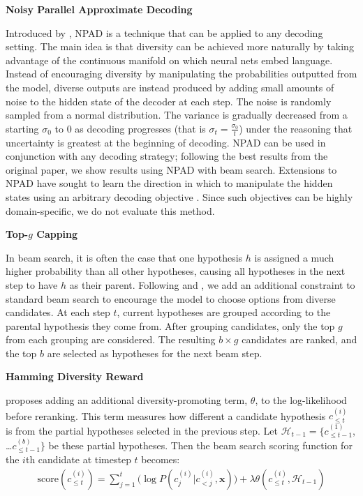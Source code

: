 \documentclass[thesis.tex]{subfiles}
\begin{document}
\noindent\textbf{Noisy Parallel Approximate Decoding}\quad

Introduced by \cite{cho2016noisy}, NPAD is a technique that can be applied to any decoding setting.
The main idea is that diversity can be achieved more naturally by taking advantage of the continuous manifold on which neural nets embed language. Instead of encouraging diversity by manipulating the probabilities outputted from the model, diverse outputs are instead produced by adding small amounts of noise to the hidden state of the decoder at each step. The noise is randomly sampled from a normal distribution. The variance is gradually decreased from a starting $\sigma_0$ to 0 as decoding progresses (that is $\sigma_t = \frac{\sigma_0}{t}$) under the reasoning that uncertainty is greatest at the beginning of decoding. NPAD can be used in conjunction with any decoding strategy; following the best results from the original paper, we show results using NPAD with beam search. Extensions to NPAD have sought to learn the direction in which to manipulate the hidden states using an arbitrary decoding objective \citep{gu2017trainable}. Since such objectives can be highly domain-specific, we do not evaluate this method.

\noindent\textbf{Top-$g$ Capping}\quad

In beam search, it is often the case that one hypothesis $h$ is assigned a much higher probability than all other hypotheses, causing all hypotheses in the next step to have $h$ as their parent. Following \cite{li2016mutual} and \cite{li2016simple}, we add an additional constraint to standard beam search to encourage the model to choose options from diverse candidates. At each step $t$, current hypotheses are grouped according to the parental hypothesis they come from. After grouping candidates, only the top $g$ from each grouping are considered. The resulting $b \times g$ candidates are ranked, and the top $b$ are selected as hypotheses for the next beam step.

\noindent\textbf{Hamming Diversity Reward}\quad

\cite{vijayakumar2016diverse} proposes adding an additional diversity-promoting term, $\theta$, to the log-likelihood before reranking. This term measures how different a candidate hypothesis $c^{(i)}_{\leq t}$ is from the partial hypotheses selected in the previous step. Let $\mathcal{H}_{t-1} = \{c^{(1)}_{\leq t-1}$, \ldots $c^{(b)}_{\leq t-1}\}$ be these partial hypotheses. Then the beam search scoring function for the $i$th candidate at timestep $t$ becomes:
\begin{align}
    \text{score}(c^{(i)}_{\leq t}) = \sum_{j=1}^t \big(\log P(c^{(i)}_j | c^{(i)}_{<j}, \textbf{x})\big) + \lambda\theta(c^{(i)}_{\leq t}, \mathcal{H}_{t-1})
\end{align}
\end{document}
